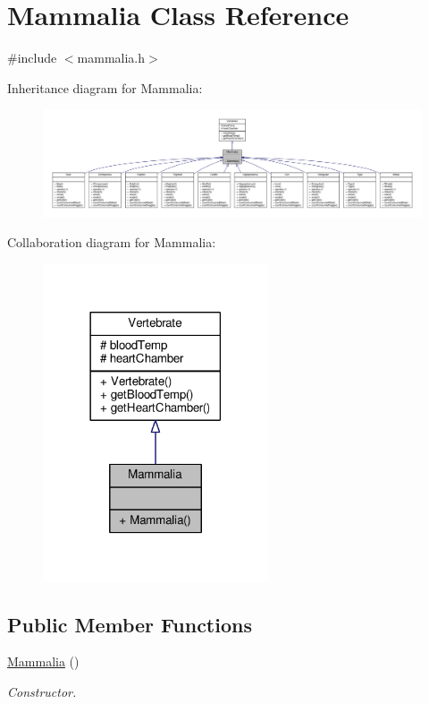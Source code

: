 \hypertarget{classMammalia}{}\section{Mammalia Class Reference}
\label{classMammalia}


{\ttfamily \#include $<$mammalia.\+h$>$}



Inheritance diagram for Mammalia\+:
\nopagebreak
\begin{figure}[H]
\begin{center}
\leavevmode
\includegraphics[width=350pt]{classMammalia__inherit__graph}
\end{center}
\end{figure}


Collaboration diagram for Mammalia\+:
\nopagebreak
\begin{figure}[H]
\begin{center}
\leavevmode
\includegraphics[width=189pt]{classMammalia__coll__graph}
\end{center}
\end{figure}
\subsection*{Public Member Functions}
\begin{DoxyCompactItemize}
\item 
\hyperlink{classMammalia_aa68908f1fa269c7d58731188afcbd970}{Mammalia} ()
\begin{DoxyCompactList}\small\item\em Constructor. \end{DoxyCompactList}\end{DoxyCompactItemize}
